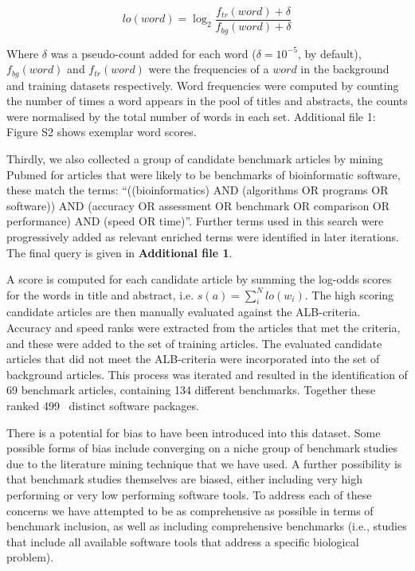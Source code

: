 \documentclass{bmcart}
\def\numTools{499}
\def\numBenchmarkPubs{69}
\def\numBenchmarks{134}
\begin{document}
{\[lo(word)=\log_2\frac{f_{tr}(word)+\delta}{f_{bg}(word)+\delta}\] 

Where
$\delta$
was a pseudo-count added for each word ($\delta = 10^{-5}$, by default),
$f_{bg}(word)$ and $f_{tr}(word)$ were the frequencies of a $word$ in
the background and training datasets respectively. Word frequencies
were computed by counting the number of times a word appears in the
pool of titles and abstracts, the counts were normalised by the total
number of words in each set. {\color{red}Additional file 1: Figure S2 shows exemplar word scores. }

Thirdly, we also collected a group of candidate benchmark articles by
mining Pubmed for articles that were likely to be benchmarks of
bioinformatic software, these match the terms: “((bioinformatics)
AND (algorithms OR programs OR software)) AND (accuracy OR assessment
OR benchmark OR comparison OR performance) AND (speed OR
time)”. Further terms used in this search were progressively added as
relevant enriched terms were identified in later iterations. The final
query is given in {\color{red} \textbf{Additional file 1}}.

A score is computed for each candidate article by summing the log-odds
scores for the words in title and abstract,
i.e. $s(a)=\sum_i^Nlo(w_i)$. The high scoring candidate articles are
then manually evaluated against the ALB-criteria. Accuracy and speed
ranks were extracted from the articles that met the criteria, and
these were added to the set of training articles. The evaluated
candidate articles that did not meet the ALB-criteria were incorporated
into the set of background articles. This process was iterated and resulted in the identification of
{\color{black}\numBenchmarkPubs} benchmark articles,
containing {\color{black}\numBenchmarks} different benchmarks. Together these
ranked {\color{black}\numTools~} distinct software packages.

There is a potential for bias to have been introduced into this
dataset. Some possible forms of bias include converging on a niche
group of benchmark studies due to the literature mining technique that
we have used. A further possibility is that benchmark studies
themselves are biased, either including very high performing or very
low performing software tools. To address each of these concerns we
have attempted to be as comprehensive as possible in terms of
benchmark inclusion, as well as including comprehensive benchmarks (i.e.,
studies that include all available software tools that
address a specific biological problem).

}
\end{document}

